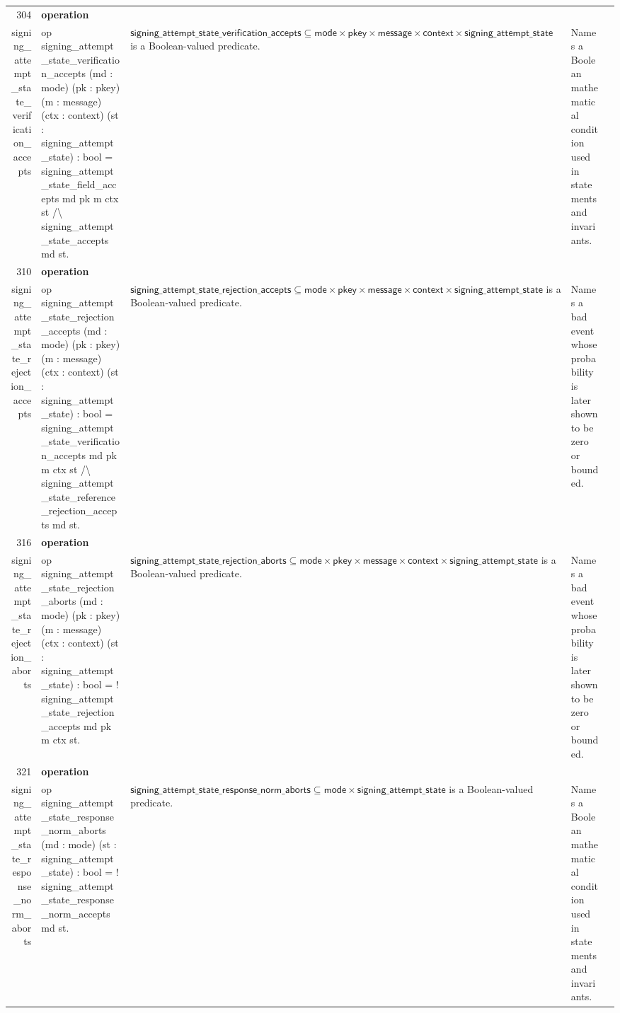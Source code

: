 \documentclass[10pt]{article}
\newcommand{\ec}[1]{\begingroup\ttfamily\scriptsize #1\endgroup}
\begin{document}
\begin{longtable}{r L{0.17\textwidth} L{0.26\textwidth} L{0.27\textwidth} L{0.20\textwidth}}
304 & \textbf{operation}\\\ec{signing\_attempt\_state\_verification\_accepts} & \ec{op signing\_attempt\_state\_verification\_accepts (md : mode) (pk : pkey) (m : message) (ctx : context) (st : signing\_attempt\_state) : bool = signing\_attempt\_state\_field\_accepts md pk m ctx st /\textbackslash{} signing\_attempt\_state\_accepts md st.} & \(\mathsf{signing\_attempt\_state\_verification\_accepts} \subseteq \mathsf{mode} \times \mathsf{pkey} \times \mathsf{message} \times \mathsf{context} \times \mathsf{signing\_attempt\_state}\) is a Boolean-valued predicate. & Names a Boolean mathematical condition used in statements and invariants. \\
310 & \textbf{operation}\\\ec{signing\_attempt\_state\_rejection\_accepts} & \ec{op signing\_attempt\_state\_rejection\_accepts (md : mode) (pk : pkey) (m : message) (ctx : context) (st : signing\_attempt\_state) : bool = signing\_attempt\_state\_verification\_accepts md pk m ctx st /\textbackslash{} signing\_attempt\_state\_reference\_rejection\_accepts md st.} & \(\mathsf{signing\_attempt\_state\_rejection\_accepts} \subseteq \mathsf{mode} \times \mathsf{pkey} \times \mathsf{message} \times \mathsf{context} \times \mathsf{signing\_attempt\_state}\) is a Boolean-valued predicate. & Names a bad event whose probability is later shown to be zero or bounded. \\
316 & \textbf{operation}\\\ec{signing\_attempt\_state\_rejection\_aborts} & \ec{op signing\_attempt\_state\_rejection\_aborts (md : mode) (pk : pkey) (m : message) (ctx : context) (st : signing\_attempt\_state) : bool = ! signing\_attempt\_state\_rejection\_accepts md pk m ctx st.} & \(\mathsf{signing\_attempt\_state\_rejection\_aborts} \subseteq \mathsf{mode} \times \mathsf{pkey} \times \mathsf{message} \times \mathsf{context} \times \mathsf{signing\_attempt\_state}\) is a Boolean-valued predicate. & Names a bad event whose probability is later shown to be zero or bounded. \\
321 & \textbf{operation}\\\ec{signing\_attempt\_state\_response\_norm\_aborts} & \ec{op signing\_attempt\_state\_response\_norm\_aborts (md : mode) (st : signing\_attempt\_state) : bool = ! signing\_attempt\_state\_response\_norm\_accepts md st.} & \(\mathsf{signing\_attempt\_state\_response\_norm\_aborts} \subseteq \mathsf{mode} \times \mathsf{signing\_attempt\_state}\) is a Boolean-valued predicate. & Names a Boolean mathematical condition used in statements and invariants. \\

\end{longtable}
\end{document}
